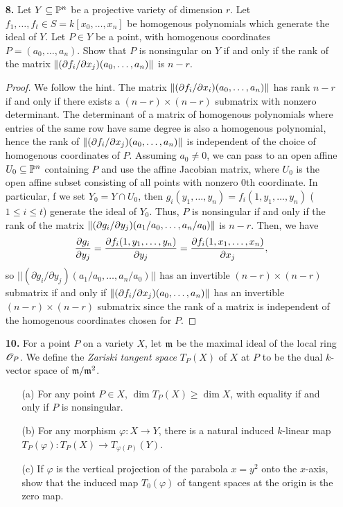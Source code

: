 \documentclass{article}
\begin{document}
\begin{enumerate} [label=\textbf{\arabic*.}, leftmargin=0cm]
\item[\textbf{8.}] Let $Y \subseteq \mathbb{P}^n$ be a projective variety of dimension $r$. Let $f_1, \dots, f_t \in S = k[x_0, \dots, x_n]$ be homogenous polynomials which generate the ideal of $Y$. Let $P \in Y$ be a point, with homogenous coordinates $P = (a_0, \dots, a_n)$. Show that $P$ is nonsingular on $Y$ if and only if the rank of the matrix $\norm{(\partial f_i / \partial x_j)(a_0, \dots, a_n)}$ is $n - r$.

\begin{proof}
    We follow the hint.
    The matrix $\norm{(\partial f_i / \partial x_i)(a_0, \dots, a_n)}$ has rank $n-r$ if and only if there exists a $(n - r) \times (n - r)$ submatrix with nonzero determinant.
    The determinant of a matrix of homogenous polynomials where entries of the same row have same degree is also a homogenous polynomial, hence the rank of $\norm{(\partial f_i / \partial x_j)(a_0, \dots, a_n)}$ is independent of the choice of homogenous coordinates of $P$.
    Assuming $a_0 \neq 0$, we can pass to an open affine $U_0 \subseteq \mathbb{P}^n$ containing $P$ and use the affine Jacobian matrix, where $U_0$ is the open affine subset consisting of all points with nonzero $0$th coordinate.
    In particular, f we set $Y_0 = Y \cap U_0$, then $g_i(y_1, \dots, y_n) = f_i(1, y_1, \dots, y_n)$ ($1 \leq i \leq t$) generate the ideal of $Y_0$.
    Thus, $P$ is nonsingular if and only if the rank of the matrix $\norm{(\partial g_i / \partial y_j)(a_1 / a_0, \dots, a_n / a_0)}$ is $n - r$.
    Then, we have
    \begin{equation*}
        \pdv{g_i}{y_j} = \pdv{f_i(1, y_1, \dots, y_n)}{y_j} = \pdv{f_i(1, x_1, \dots, x_n)}{x_j},
    \end{equation*}
    so $|| (\partial g_i / \partial y_j)(a_1 / a_0, \dots, a_n / a_0) ||$ has an invertible $(n - r) \times (n - r)$ submatrix if and only if $\norm{(\partial f_i / \partial x_j)(a_0, \dots, a_n)}$ has an invertible $(n - r) \times (n - r)$ submatrix since the rank of a matrix is independent of the homogenous coordinates chosen for $P$.
\end{proof}

\item[\textbf{10.}] For a point $P$ on a variety $X$, let $\mathfrak{m}$ be the maximal ideal of the local ring $\mathscr{O}_P$. We define the \textit{Zariski tangent space} $T_P(X)$ of $X$ at $P$ to be the dual $k$-vector space of $\mathfrak{m} / \mathfrak{m}^2$.
\begin{itemize}
    \item[(a)] For any point $P \in X$, $\dim{T_P(X)} \geq \dim{X}$, with equality if and only if $P$ is nonsingular.
    \item[(b)] For any morphism $\varphi : X \to Y$, there is a natural induced $k$-linear map $T_P(\varphi) : T_P(X) \to T_{\varphi(P)}(Y)$.
    \item[(c)] If $\varphi$ is the vertical projection of the parabola $x = y^2$ onto the $x$-axis, show that the induced map $T_0(\varphi)$ of tangent spaces at the origin is the zero map.
\end{itemize}


\end{enumerate}
\end{document}
